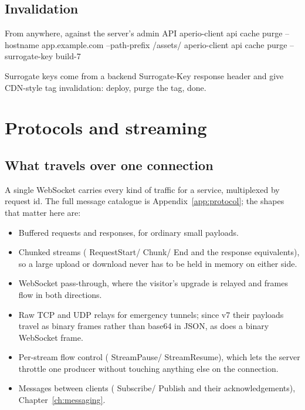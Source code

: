 \documentclass[11pt,a4paper,oneside]{book}
\newcommand{\aperiobreakableunderscore}{\textunderscore\allowbreak}
\newcommand{\aperiocodebreaks}{\XeTeXinterchartokenstate=1 }
\newcommand{\aperiocodebreaks}{}
\DeclareRobustCommand{\code}[1]{{\ttfamily\small\aperiocodebreaks
  \let\_\aperiobreakableunderscore#1}}
\begin{document}
\section{Invalidation}

\begin{codecard}[aperiosh]{From anywhere, against the server's admin API}
aperio-client api cache purge --hostname app.example.com --path-prefix /assets/
aperio-client api cache purge --surrogate-key build-7
\end{codecard}

Surrogate keys come from a backend \code{Surrogate-Key} response header
and give CDN-style tag invalidation: deploy, purge the tag, done.

\chapter{Protocols and streaming}
\label{ch:protocol-chapter}

\section{What travels over one connection}

A single WebSocket carries every kind of traffic for a service,
multiplexed by request id. The full message catalogue is
Appendix~\ref{app:protocol}; the shapes that matter here are:

\begin{itemize}[leftmargin=1.3em]
  \item Buffered requests and responses, for ordinary small payloads.
  \item Chunked streams (\code{RequestStart}/\code{Chunk}/\code{End} and
        the response equivalents), so a large upload or download never
        has to be held in memory on either side.
  \item WebSocket pass-through, where the visitor's upgrade is relayed and
        frames flow in both directions.
  \item Raw TCP and UDP relays for emergency tunnels; since v7 their
        payloads travel as binary frames rather than base64 in JSON, as
        does a binary WebSocket frame.
  \item Per-stream flow control (\code{StreamPause}/\code{StreamResume}),
        which lets the server throttle one producer without touching
        anything else on the connection.
  \item Messages between clients (\code{Subscribe}/\code{Publish} and
        their acknowledgements), Chapter~\ref{ch:messaging}.
\end{itemize}
\end{document}
